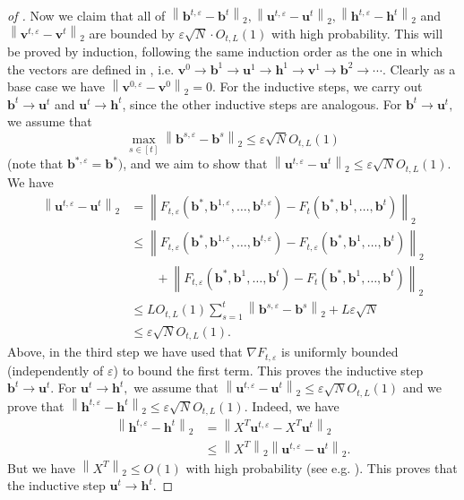 \documentclass{article}
\newcommand{\1}{\mathbbm{1}}
\newcommand{\norm}[1]{\left\lVert#1\right\rVert}
\theoremstyle{plain}
\theoremstyle{definition}
\theoremstyle{remark}
\newcommand{\eps}{\varepsilon}
\newcommand{\bfu}{\boldsymbol{u}}
\newcommand{\bfv}{\boldsymbol{v}}
\newcommand{\bfh}{\boldsymbol{h}}
\newcommand{\bfb}{\boldsymbol{b}}
\begin{document}
\begin{proof}[of ]
Now we claim that all of $\norm{\bfb^{t,\eps}-\bfb^t}_2, \norm{\bfu^{t,\eps}-\bfu^t}_2,\norm{\bfh^{t,\eps}-\bfh^t}_2$ and $\norm{\bfv^{t,\eps}-\bfv^t}_2$ are bounded by $\eps \sqrt{N}\cdot O_{t,L}(1) $ with high probability. This will be proved by induction, following the same induction order as the one in which the vectors are defined in , i.e. $\bfv^0\to \bfb^1\to \bfu^1\to\bfh^1\to\bfv^1\to\bfb^2\to\cdots.$ Clearly as a base case we have $\norm{\bfv^{0,\eps} - \bfv^0}_2=0.$ For the inductive steps, we carry out $\bfb^t\to \bfu^t$ and $\bfu^t\to \bfh^t$, since the other inductive steps are analogous. For $\bfb^t\to \bfu^t,$ we assume that 
\[
\max_{s\in [t]}\norm{\bfb^{s,\eps} - \bfb^s}_2 \leq \eps \sqrt{N} O_{t,L}(1)
\]
(note that $\bfb^{*,\eps} = \bfb^*)$, and we aim to show that $\norm{\bfu^{t,\eps} - \bfu^t}_2\leq \eps \sqrt{N} O_{t,L}(1).$ We have
\begin{align*}
    \norm{\bfu^{t,\eps} - \bfu^t}_2 &= \norm{F_{t,\eps}(\bfb^*,\bfb^{1,\eps},\dots,\bfb^{t,\eps}) - F_t(\bfb^*,\bfb^{1},\dots,\bfb^{t})}_2 \\
    &\leq \norm{F_{t,\eps}(\bfb^*,\bfb^{1,\eps},\dots,\bfb^{t,\eps}) - F_{t,\eps}(\bfb^*,\bfb^{1},\dots,\bfb^{t})}_2  \\
    &\qquad + \norm{F_{t,\eps}(\bfb^*,\bfb^{1},\dots,\bfb^{t}) - F_{t}(\bfb^*,\bfb^{1},\dots,\bfb^{t})}_2 \\
    &\leq L O_{t,L}(1)\sum_{s=1}^t \norm{\bfb^{s,\eps} - \bfb^s}_2 + L\eps \sqrt{N} \\
    &\leq \eps\sqrt{N} O_{t,L}(1).
\end{align*}
Above, in the third step we have used that $\nabla F_{t,\eps}$ is uniformly bounded (independently of $\eps$) to bound the first term. This proves the inductive step $\bfb^t\to\bfu^t.$ For $\bfu^t\to\bfh^t,$ we assume that $\norm{\bfu^{t,\eps} - \bfu^t}_2 \leq \eps\sqrt{N} O_{t,L}(1)$ and we prove that $\norm{\bfh^{t,\eps} - \bfh^t}_2 \leq \eps\sqrt{N} O_{t,L}(1)$. Indeed, we have 
\begin{align*}
    \norm{\bfh^{t,\eps} - \bfh^t}_2 &= \norm{X^T\bfu^{t,\eps} - X^T\bfu^t}_2  \\
    &\leq \norm{X^T}_2\norm{\bfu^{t,\eps} - \bfu^t}_2.
\end{align*}
But we have $\norm{X^T}_2\leq O(1)$ with high probability (see e.g. \cite{vershynin2018high}). This proves that the inductive step $\bfu^t\to\bfh^t.$


\end{proof}
\end{document}
